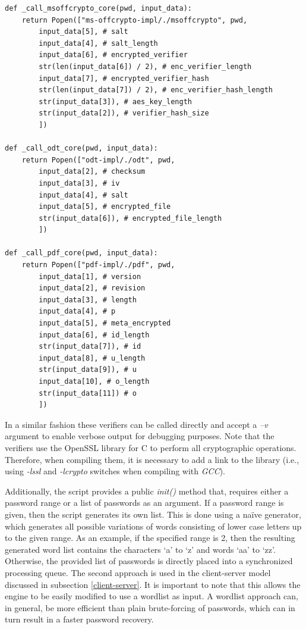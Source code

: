 \documentclass[11pt,oneside]{fithesis2}
\begin{document}
\begin{lstlisting}
def _call_msoffcrypto_core(pwd, input_data):
    return Popen(["ms-offcrypto-impl/./msoffcrypto", pwd, 
        input_data[5], # salt
        input_data[4], # salt_length
        input_data[6], # encrypted_verifier
        str(len(input_data[6]) / 2), # enc_verifier_length
        input_data[7], # encrypted_verifier_hash
        str(len(input_data[7]) / 2), # enc_verifier_hash_length
        str(input_data[3]), # aes_key_length
        str(input_data[2]), # verifier_hash_size
        ])

def _call_odt_core(pwd, input_data):
    return Popen(["odt-impl/./odt", pwd, 
        input_data[2], # checksum
        input_data[3], # iv
        input_data[4], # salt
        input_data[5], # encrypted_file
        str(input_data[6]), # encrypted_file_length
        ]) 

def _call_pdf_core(pwd, input_data):
    return Popen(["pdf-impl/./pdf", pwd, 
        input_data[1], # version
        input_data[2], # revision
        input_data[3], # length
        input_data[4], # p
        input_data[5], # meta_encrypted 
        input_data[6], # id_length 
        str(input_data[7]), # id
        input_data[8], # u_length 
        str(input_data[9]), # u 
        input_data[10], # o_length
        str(input_data[11]) # o
        ]) 
\end{lstlisting}


In a similar fashion these verifiers can be called directly and accept a \textit{–v} argument to enable verbose output for debugging purposes. Note that the verifiers use the OpenSSL library for C \cite{openssl} to perform all cryptographic operations. Therefore, when compiling them, it is necessary to add a link to the library (i.e., using \textit{-lssl} and \textit{-lcrypto} switches when compiling with \textit{GCC}).

Additionally, the script provides a public \textit{init()} method that, requires either a password range or a list of passwords as an argument. If a password range is given, then the script generates its own list. This is done using a naïve generator, which generates all possible variations of words consisting of lower case letters up to the given range. As an example, if the specified range is 2, then the resulting generated word list contains the characters ‘a’  to ‘z’ and words ‘aa’ to ‘zz’. Otherwise, the provided list of passwords is directly placed into a synchronized processing queue. The second approach is used in the client-server model discussed in subsection \ref{client-server}. It is important to note that this allows the engine to be easily modified to use a wordlist as input. A wordlist approach can, in general, be more efficient than plain brute-forcing of passwords, which can in turn result in a faster password recovery.
\end{document}
